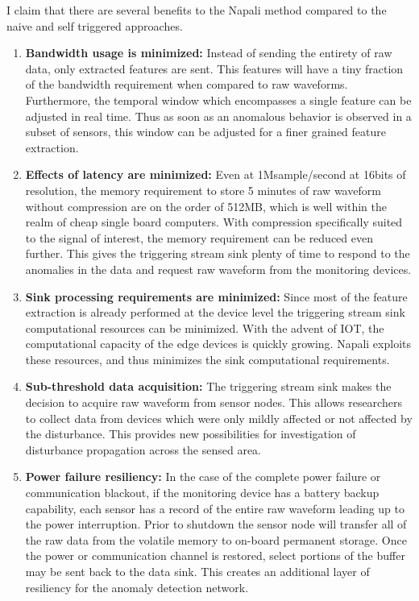 I claim that there are several benefits to the Napali method compared to the naive and self triggered approaches.
\begin{enumerate}
	\item \textbf{Bandwidth usage is minimized:} Instead of sending the entirety of raw data, only extracted features are sent. This features will have a tiny fraction of the bandwidth requirement when compared to raw waveforms. Furthermore, the temporal window which encompasses a single feature can be adjusted in real time. Thus as soon as an anomalous behavior is observed in a subset of sensors, this window can be adjusted for a finer grained feature extraction.
  
	\item \textbf{Effects of latency are minimized:} Even at 1Msample/second at 16bits of resolution, the memory requirement to store 5 minutes of raw waveform without compression are on the order of 512MB, which is well within the realm of cheap single board computers. With compression specifically suited to the signal of interest, the memory requirement can be reduced even further. This gives the triggering stream sink plenty of time to respond to the anomalies in the data and request raw waveform from the monitoring devices.
  
	\item \textbf{Sink processing requirements are minimized:} Since most of the feature extraction is already performed at the device level the triggering stream sink computational resources can be minimized. With the advent of IOT, the computational capacity of the edge devices is quickly growing. Napali exploits these resources, and thus minimizes the sink computational requirements.
  
	\item \textbf{Sub-threshold data acquisition:} The triggering stream sink makes the decision to acquire raw waveform from sensor nodes. This allows researchers to collect data from devices which were only mildly affected or not affected by the disturbance. This provides new possibilities for investigation of disturbance propagation across the sensed area.
  
	\item \textbf{Power failure resiliency:} In the case of the complete power failure or communication blackout, if the monitoring device has a battery backup capability, each sensor has a record of the entire raw waveform leading up to the power interruption. Prior to shutdown the sensor node will transfer all of the raw data from the volatile memory to on-board permanent storage. Once the power or communication channel is restored, select portions of the buffer may be sent back to the data sink. This creates an additional layer of resiliency for the anomaly detection network.
  

\end{enumerate}
